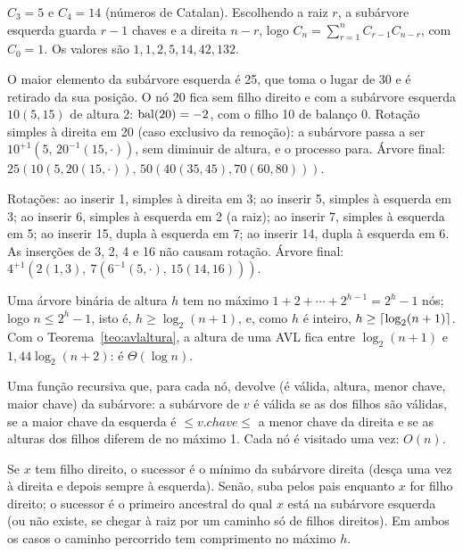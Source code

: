 $C_3=5$ e $C_4=14$ (números de Catalan). Escolhendo a raiz $r$, a subárvore esquerda guarda $r-1$ chaves e a direita $n-r$, logo $C_n=\sum_{r=1}^nC_{r-1}C_{n-r}$, com $C_0=1$. Os valores são $1,1,2,5,14,42,132$.

 O maior elemento da subárvore esquerda é 25, que toma o lugar de 30 e é retirado da sua posição. O nó 20 fica sem filho direito e com a subárvore esquerda $10(5,15)$ de altura 2: $\operatorname{bal}(20)=-2$, com o filho 10 de balanço 0. Rotação simples à direita em 20 (caso exclusivo da remoção): a subárvore passa a ser $10^{+1}(5,\,20^{-1}(15,\cdot))$, sem diminuir de altura, e o processo para. Árvore final: $25(10(5,20(15,\cdot)),\,50(40(35,45),70(60,80)))$.

 Rotações: ao inserir 1, simples à direita em 3; ao inserir 5, simples à esquerda em 3; ao inserir 6, simples à esquerda em 2 (a raiz); ao inserir 7, simples à esquerda em 5; ao inserir 15, dupla à esquerda em 7; ao inserir 14, dupla à esquerda em 6. As inserções de 3, 2, 4 e 16 não causam rotação. Árvore final: $4^{+1}(2(1,3),\ 7(6^{-1}(5,\cdot),\,15(14,16)))$.

 Uma árvore binária de altura $h$ tem no máximo $1+2+\cdots+2^{h-1}=2^h-1$ nós; logo $n\le2^h-1$, isto é, $h\ge\log_2(n+1)$, e, como $h$ é inteiro, $h\ge\lceil\log_2(n+1)\rceil$. Com o Teorema~\ref{teo:avlaltura}, a altura de uma AVL fica entre $\log_2(n+1)$ e $1{,}44\log_2(n+2)$: é $\Theta(\log n)$.

 Uma função recursiva que, para cada nó, devolve (é válida, altura, menor chave, maior chave) da subárvore: a subárvore de $v$ é válida se as dos filhos são válidas, se a maior chave da esquerda é $\le v.chave\le$ a menor chave da direita e se as alturas dos filhos diferem de no máximo 1. Cada nó é visitado uma vez: $O(n)$.

 Se $x$ tem filho direito, o sucessor é o mínimo da subárvore direita (desça uma vez à direita e depois sempre à esquerda). Senão, suba pelos pais enquanto $x$ for filho direito; o sucessor é o primeiro ancestral do qual $x$ está na subárvore esquerda (ou não existe, se chegar à raiz por um caminho só de filhos direitos). Em ambos os casos o caminho percorrido tem comprimento no máximo $h$.
